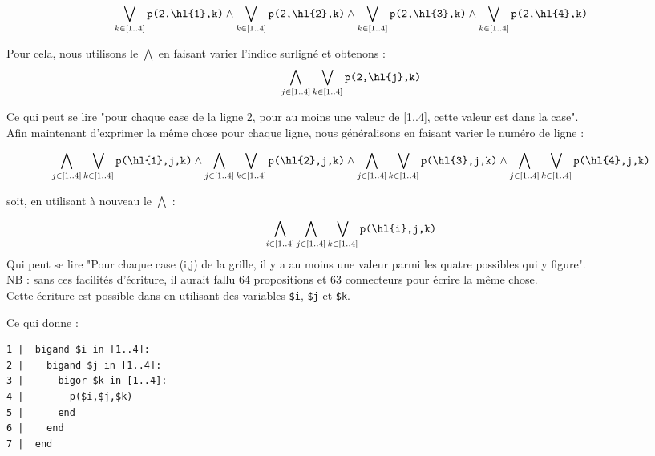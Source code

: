 \[\bigvee_{k\in [1..4]} \texttt{p(2,\hl{1},k)} \wedge \bigvee_{k\in [1..4]} \texttt{p(2,\hl{2},k)}\wedge
\bigvee_{k\in [1..4]} \texttt{p(2,\hl{3},k)} \wedge
\bigvee_{k\in [1..4]} \texttt{p(2,\hl{4},k)}\] 

Pour cela, nous utilisons le $\bigwedge$ en faisant varier l'indice surligné et obtenons : 
\[\bigwedge_{j\in [1..4]}\bigvee_{k\in [1..4]} \texttt{p(2,\hl{j},k)}\]

Ce qui peut se lire "pour chaque case de la ligne 2, pour au moins une valeur de [1..4], cette valeur est dans la case". \\

Afin maintenant d'exprimer la même chose pour chaque ligne, nous généralisons en faisant varier le numéro de ligne : 

\[\bigwedge_{j\in [1..4]}\bigvee_{k\in [1..4]} \texttt{p(\hl{1},j,k)}\wedge \bigwedge_{j\in [1..4]}\bigvee_{k\in [1..4]} \texttt{p(\hl{2},j,k)}\wedge \bigwedge_{j\in [1..4]}\bigvee_{k\in [1..4]} \texttt{p(\hl{3},j,k)}\wedge \bigwedge_{j\in [1..4]}\bigvee_{k\in [1..4]} \texttt{p(\hl{4},j,k)}\]

soit, en utilisant à nouveau le $\bigwedge$ :

\[\bigwedge_{i\in [1..4]}\bigwedge_{j\in [1..4]}\bigvee_{k\in [1..4]} \texttt{p(\hl{i},j,k)}\]
Qui peut se lire "Pour chaque case (i,j) de la grille, il y a au moins une valeur parmi les quatre possibles qui y figure". \\

\noindent NB : sans ces facilités d'écriture, il aurait fallu 64 propositions et 63 connecteurs pour écrire la même chose. \\

Cette écriture est possible dans \touist en utilisant des variables \texttt{\$i}, \texttt{\$j} et \texttt{\$k}.

Ce qui donne : 
\begin{verbatim}
1 |  bigand $i in [1..4]:
2 |    bigand $j in [1..4]:
3 |      bigor $k in [1..4]:
4 |        p($i,$j,$k)
5 |      end
6 |    end
7 |  end
\end{verbatim}


